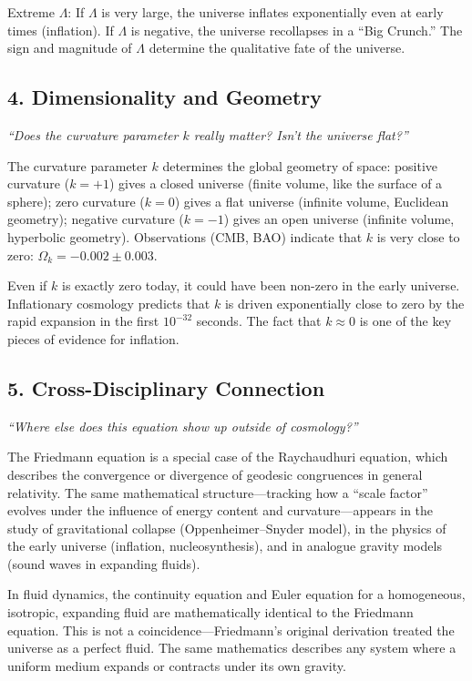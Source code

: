Extreme $\Lambda$: If $\Lambda$ is very large, the universe inflates exponentially even at early times (inflation). If $\Lambda$ is negative, the universe recollapses in a ``Big Crunch.'' The sign and magnitude of $\Lambda$ determine the qualitative fate of the universe.

\subsection*{4. Dimensionality and Geometry}
\textit{``Does the curvature parameter $k$ really matter? Isn't the universe flat?''}

The curvature parameter $k$ determines the global geometry of space: positive curvature ($k = +1$) gives a closed universe (finite volume, like the surface of a sphere); zero curvature ($k = 0$) gives a flat universe (infinite volume, Euclidean geometry); negative curvature ($k = -1$) gives an open universe (infinite volume, hyperbolic geometry). Observations (CMB, BAO) indicate that $k$ is very close to zero: $\Omega_k = -0.002 \pm 0.003$.

Even if $k$ is exactly zero today, it could have been non-zero in the early universe. Inflationary cosmology predicts that $k$ is driven exponentially close to zero by the rapid expansion in the first $10^{-32}$ seconds. The fact that $k \approx 0$ is one of the key pieces of evidence for inflation.

\subsection*{5. Cross-Disciplinary Connection}
\textit{``Where else does this equation show up outside of cosmology?''}

The Friedmann equation is a special case of the Raychaudhuri equation, which describes the convergence or divergence of geodesic congruences in general relativity. The same mathematical structure---tracking how a ``scale factor'' evolves under the influence of energy content and curvature---appears in the study of gravitational collapse (Oppenheimer--Snyder model), in the physics of the early universe (inflation, nucleosynthesis), and in analogue gravity models (sound waves in expanding fluids).

In fluid dynamics, the continuity equation and Euler equation for a homogeneous, isotropic, expanding fluid are mathematically identical to the Friedmann equation. This is not a coincidence---Friedmann's original derivation treated the universe as a perfect fluid. The same mathematics describes any system where a uniform medium expands or contracts under its own gravity.

